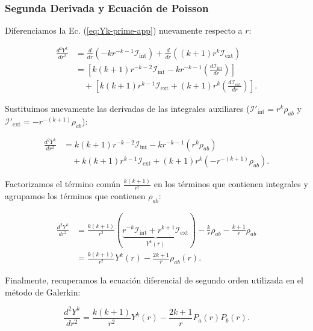 \documentclass[12pt, a4paper, oneside, spanish]{book}
\begin{document}
\subsubsection{Segunda Derivada y Ecuación de Poisson}

Diferenciamos la Ec. (\cref{eq:Yk-prime-app}) nuevamente respecto a $r$:

\begin{align*}
    \frac{d^2Y^k}{dr^2} &= \frac{d}{dr}\left( -k r^{-k-1} \mathcal{I}_{\text{int}} \right) + \frac{d}{dr}\left( (k+1) r^k \mathcal{I}_{\text{ext}} \right) \\
    &= \left[ k(k+1) r^{-k-2} \mathcal{I}_{\text{int}} - k r^{-k-1} \left( \frac{d\mathcal{I}_{\text{int}}}{dr} \right) \right] \\
    &\quad + \left[ k(k+1) r^{k-1} \mathcal{I}_{\text{ext}} + (k+1) r^k \left( \frac{d\mathcal{I}_{\text{ext}}}{dr} \right) \right].
\end{align*}

Sustituimos nuevamente las derivadas de las integrales auxiliares ($\mathcal{I}'_{\text{int}} = r^k \rho_{ab}$ y $\mathcal{I}'_{\text{ext}} = -r^{-(k+1)} \rho_{ab}$):

\begin{align*}
    \frac{d^2Y^k}{dr^2} &= k(k+1) r^{-k-2} \mathcal{I}_{\text{int}} - k r^{-k-1} (r^k \rho_{ab}) \\
    &\quad + k(k+1) r^{k-1} \mathcal{I}_{\text{ext}} + (k+1) r^k (-r^{-(k+1)} \rho_{ab}).
\end{align*}

Factorizamos el término común $\frac{k(k+1)}{r^2}$ en los términos que contienen integrales y agrupamos los términos que contienen $\rho_{ab}$:

\begin{align*}
    \frac{d^2Y^k}{dr^2} &= \frac{k(k+1)}{r^2} \left( \underbrace{r^{-k} \mathcal{I}_{\text{int}} + r^{k+1} \mathcal{I}_{\text{ext}}}_{Y^k(r)} \right) - \frac{k}{r} \rho_{ab} - \frac{k+1}{r} \rho_{ab} \\
    &= \frac{k(k+1)}{r^2} Y^k(r) - \frac{2k+1}{r} \rho_{ab}(r).
\end{align*}

Finalmente, recuperamos la ecuación diferencial de segundo orden utilizada en el método de Galerkin:

\begin{equation}
    \frac{d^2 Y^k}{dr^2} = \frac{k(k+1)}{r^2} Y^k(r) - \frac{2k+1}{r} P_a(r)P_b(r).
\end{equation}
\end{document}
